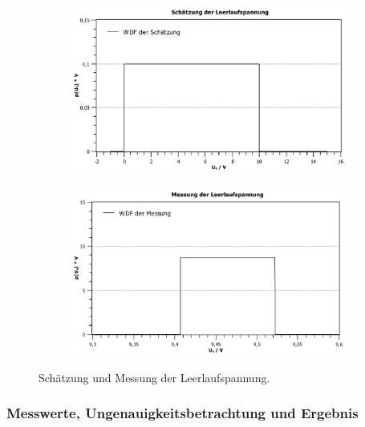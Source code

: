 \documentclass[11pt,a4paper,titlepage, ngerman]{article}
\begin{document}
				\begin{figure}	
					\begin{subfigure}{0.45\textwidth}
						\centering
						\includegraphics[scale=0.3]{Spannungsschaetzung.pdf}
					\end{subfigure}
					\begin{subfigure}{0.45\textwidth}
						\centering
						\includegraphics[scale=0.3]{Spannungsmessung.pdf}
					\end{subfigure}	
					\caption{Schätzung und Messung der Leerlaufspannung.}
					\label{fig:spannung}
				\end{figure}
			
			\subsubsection{Messwerte, Ungenauigkeitsbetrachtung und Ergebnis}
				\label{2.1.2}
				
\end{document}

